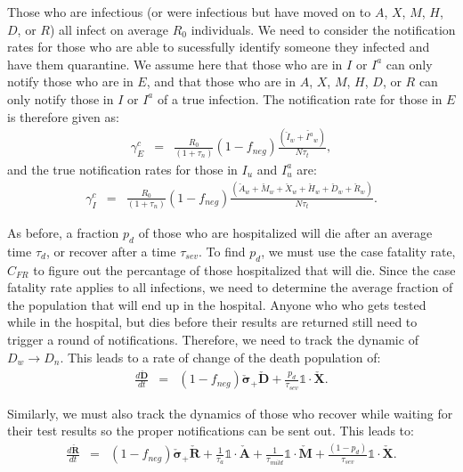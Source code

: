 \documentclass[notitlepage, superscriptaddress]{revtex4-2}
\begin{document}
Those who are infectious (or were infectious but have moved on to $A$, $X$, $M$, $H$, $D$, or $R$) all infect on average $R_{0}$ individuals. We need to consider the notification rates for those who are able to sucessfully identify someone they infected and have them quarantine. We assume here that those who are in $I$ or $I^{a}$ can only notify those who are in $E$, and that those who are in $A$, $X$, $M$, $H$, $D$, or $R$ can only notify those in $I$ or $I^{a}$ of a true infection. The notification rate for those in $E$ is therefore given as:
\begin{eqnarray}
\gamma^{c}_{E} &=& \frac{R_{0}}{(1+\tau_{n})} (1-f_{neg}) \frac{(\check{I}_{w} + \check{I^{a}}_{w})}{N \tau_{t}},
\end{eqnarray} 
and the true notification rates for those in $I_{u}$ and $I^{a}_{u}$ are:
\begin{eqnarray}
\gamma^{c}_{I} &=&  \frac{R_{0}}{(1+\tau_{n})} (1-f_{neg}) \frac{(\check{A}_{w} + \check{M}_{w} + \check{X}_{w} + \check{H}_{w} + \check{D}_{w} + \check{R}_{w} )}{N\tau_{t}}.
\end{eqnarray}   

As before, a fraction $p_{d}$ of those who are hospitalized will die after an average time $\tau_{d}$, or recover after a time $\tau_{sev}$. To find $p_{d}$, we must use the case fatality rate, $C_{FR}$ to figure out the percantage of those hospitalized that will die. Since the case fatality rate applies to all infections, we need to determine the average fraction of the population that will end up in the hospital. Anyone who who gets tested while in the hospital, but dies before their results are returned still need to trigger a round of notifications. Therefore, we need to track the dynamic of $D_{w} \rightarrow D_{n}$. This leads to a rate of change of the death population of:
\begin{eqnarray}
\frac{d \boldsymbol{\check{D}}}{dt} &=& (1-f_{neg}) \boldsymbol{\check{\sigma}_{+}} \boldsymbol{\check{D}} +  \frac{p_{d}}{\tau_{sev}} \mathbb{1} \cdot \boldsymbol{\check{X}}. 
\end{eqnarray}

Similarly, we must also track the dynamics of those who recover while waiting for their test results so the proper notifications can be sent out. This leads to:
\begin{eqnarray}
\frac{d \boldsymbol{\check{R}}}{dt} &=& (1-f_{neg}) \boldsymbol{\check{\sigma}_{+}} \boldsymbol{\check{R}} + \frac{1}{\tau_{a}} \mathbb{1} \cdot \boldsymbol{\check{A}} + \frac{1}{\tau_{mild}} \mathbb{1} \cdot \boldsymbol{\check{M}} + \frac{(1-p_{d})}{\tau_{sev}} \mathbb{1} \cdot \boldsymbol{\check{X}}. 
\end{eqnarray}
\end{document}
